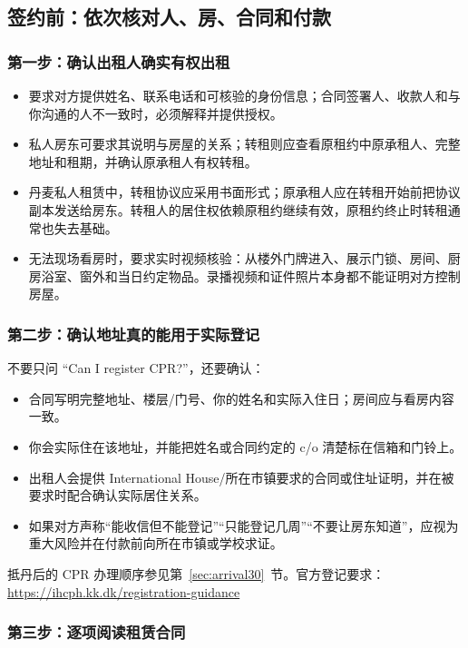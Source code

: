\subsection{签约前：依次核对人、房、合同和付款}

\subsubsection{第一步：确认出租人确实有权出租}

\begin{itemize}[leftmargin=2em,itemsep=3pt]
  \item 要求对方提供姓名、联系电话和可核验的身份信息；合同签署人、收款人和与你沟通的人不一致时，必须解释并提供授权。
  \item 私人房东可要求其说明与房屋的关系；转租则应查看原租约中原承租人、完整地址和租期，并确认原承租人有权转租。
  \item 丹麦私人租赁中，转租协议应采用书面形式；原承租人应在转租开始前把协议副本发送给房东。转租人的居住权依赖原租约继续有效，原租约终止时转租通常也失去基础。
  \item 无法现场看房时，要求实时视频核验：从楼外门牌进入、展示门锁、房间、厨房浴室、窗外和当日约定物品。录播视频和证件照片本身都不能证明对方控制房屋。
\end{itemize}

\subsubsection{第二步：确认地址真的能用于实际登记}

不要只问 ``Can I register CPR?''，还要确认：

\begin{itemize}[leftmargin=2em,itemsep=3pt]
  \item 合同写明完整地址、楼层/门号、你的姓名和实际入住日；房间应与看房内容一致。
  \item 你会实际住在该地址，并能把姓名或合同约定的 c/o 清楚标在信箱和门铃上。
  \item 出租人会提供 International House/所在市镇要求的合同或住址证明，并在被要求时配合确认实际居住关系。
  \item 如果对方声称“能收信但不能登记”“只能登记几周”“不要让房东知道”，应视为重大风险并在付款前向所在市镇或学校求证。
\end{itemize}

抵丹后的 CPR 办理顺序参见第~\ref{sec:arrival30}~节。官方登记要求：\url{https://ihcph.kk.dk/registration-guidance}

\subsubsection{第三步：逐项阅读租赁合同}


